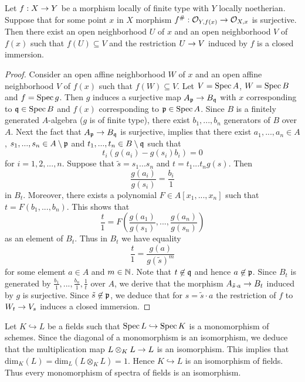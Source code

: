 \begin{proposition}\label{proposition:local_surjection_is_locally_a_locally_closed_immersion}
Let $f:X\rightarrow Y$ be a morphism locally of finite type with $Y$ locally noetherian. Suppose that for some point $x$ in $X$ morphism $f^{\#}:{\mathcal O}_{Y,f(x)}\rightarrow {\mathcal O}_{X,x}$ is surjective. Then there exist an open neighborhood $U$ of $x$ and an open neighborhood $V$ of $f(x)$ such that $f(U)\subseteq V$ and the restriction $U\rightarrow V$ induced by $f$ is a closed immersion.
\end{proposition}
\begin{proof}
Consider an open affine neighborhood $W$ of $x$ and an open affine neighborhood $V$ of $f(x)$ such that $f(W)\subseteq V$. Let $V = \mathrm{Spec}\, A$, $W = \mathrm{Spec}\, B$ and $f = \mathrm{Spec}\, g$. Then $g$ induces a surjective map $A_{\mathfrak{p}}\rightarrow B_{\mathfrak{q}}$ with $x$ corresponding to $\mathfrak{q}\in \mathrm{Spec}\, B$ and $f(x)$ corresponding to $\mathfrak{p}\in \mathrm{Spec}\, A$. Since $B$ is a finitely generated $A$-algebra ($g$ is of finite type), there exist $b_1,...,b_n$ generators of $B$ over $A$. Next the fact that $A_{\mathfrak{p}}\rightarrow B_{\mathfrak{q}}$ is surjective, implies that there exist $a_1,...,a_n\in A$, $s_1,...,s_n \in A\setminus \mathfrak{p}$ and $t_1,...,t_n\in B\setminus \mathfrak{q}$ such that
$$t_i\left(g(a_i) - g(s_i)b_i\right) = 0$$
for $i=1,2,...,n$. Suppose that $\tilde{s} = s_1...s_n$ and $t = t_1...t_n g(s)$. Then
$$\frac{g(a_i)}{g(s_i)} = \frac{b_i}{1}$$
in $B_t$. Moreover, there exists a polynomial $F\in A[x_1,...,x_n]$ such that $t = F(b_1,...,b_n)$. This shows that
$$\frac{t}{1} = F\left(\frac{g(a_1)}{g(s_1)},...,\frac{g(a_n)}{g(s_n)}\right)$$
as an element of $B_t$. Thus in $B_t$ we have equality
$$\frac{t}{1} = \frac{g(a)}{g(\tilde{s})^m}$$
for some element $a\in A$ and $m\in {\mathbb N}$. Note that $t\not \in \mathfrak{q}$ and hence $a \not \in \mathfrak{p}$. Since $B_t$ is generated by $\frac{b_1}{1},...,\frac{b_n}{1},\frac{1}{t}$ over $A$, we derive that the morphism $A_{\tilde{s}\cdot a}\rightarrow B_t$ induced by $g$ is surjective. Since $\tilde{s}\not \in \mathfrak{p}$, we deduce that for $s = \tilde{s}\cdot a$ the restriction of $f$ to $W_t \rightarrow V_s$ induces a closed immersion.
\end{proof}

\begin{remark}\label{remark:monomorphisms_of_fields_spectra}
Let $K \hookrightarrow L$ be a fields such that $\mathrm{Spec}\, L\hookrightarrow \mathrm{Spec}\, K$ is a monomorphism of schemes. Since the diagonal of a monomorphism is an isomorphism, we deduce that the multiplication map $L\otimes_KL\rightarrow L$ is an isomorphism. This implies that $\mathrm{dim}_K(L) = \mathrm{dim}_L\left(L\otimes_KL\right) = 1$. Hence $K\hookrightarrow L$ is an isomorphism of fields. Thus every monomorphism of spectra of fields is an isomorphism.
\end{remark}

